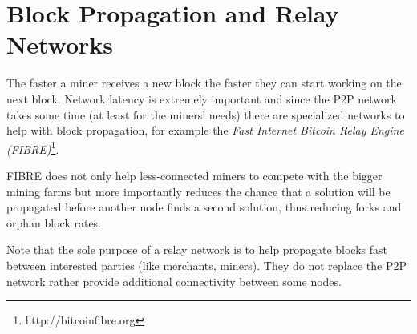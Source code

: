 \section{Block Propagation and Relay Networks}
The faster a miner receives a new block the faster they can start working on the next block. Network latency is extremely important and since the P2P network takes some time (at least for the miners' needs) there are specialized networks to help with block propagation, for example the \emph{Fast Internet Bitcoin Relay Engine (FIBRE)}\footnote{http://bitcoinfibre.org}. 

FIBRE does not only help less-connected miners to compete with the bigger mining farms but more importantly reduces the chance that a solution will be propagated before another node finds a second solution, thus reducing forks and orphan block rates.

Note that the sole purpose of a relay network is to help propagate blocks fast between interested parties (like merchants, miners). They do not replace the P2P network rather provide additional connectivity between some nodes.


